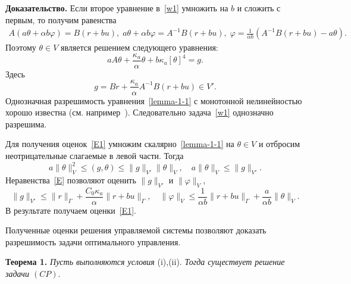 \documentclass[12pt]{article}
\begin{document}
    {\bf Доказательство.}
    Если второе уравнение в~\eqref{w1} умножить на $b$ и сложить с первым, то получим равенства
    \begin{gather*}
        A \left( a \theta + \alpha b \varphi \right) = B(r + bu),\;
        a\theta + \alpha b \varphi = A^{-1}B(r + bu),\;
        \varphi = \frac{1}{\alpha b}(A^{-1}B(r +bu) - a\theta).
    \end{gather*}
    Поэтому $\theta \in V$ является решением следующего уравнения:
    \begin{equation}
        \label{lemma-1-1}
        a A \theta + \frac{\kappa_a}{\alpha} \theta + b\kappa_a [\theta]^4 = g.
    \end{equation}
    Здесь \[ g = Br + \frac{\kappa_a}{\alpha}A^{-1}B(r+bu) \in V'. \]
    Однозначная разрешимость уравнения~\eqref{lemma-1-1} с монотонной нелинейностью
    хорошо известна (см.
    например~\cite{Kufner}).
    Следовательно задача~\eqref{w1} однозначно разрешима.

    Для получения оценок~\eqref{E1} умножим скалярно~\eqref{lemma-1-1} на $\theta \in V$ и отбросим неотрицательные
    слагаемые в левой части.
    Тогда
    \[
        a \|\theta\|^2_V \leq (g, \theta) \leq \|g\|_{V'}\|\theta\|_V,
        \quad a\|\theta\|_V \leq \|g\|_{V'}.
    \]
    Неравенства~\eqref{E} позволяют оценить $\|g\|_{V'}$ и $\|\varphi\|_V $,
    \[
        \|g\|_{V'} \leq \|r\|_\Gamma + \frac{C_0\kappa_a}{\alpha}\|r + bu\|_\Gamma, \quad
        \|\varphi\|_V \leq \frac{1}{\alpha b} \|r + bu\|_\Gamma + \frac{a}{\alpha b} \|\theta\|_V.
    \]
    В результате получаем оценки~\eqref{E1}.

Полученные оценки решения управляемой системы позволяют доказать
разрешимость задачи оптимального управления.

    \textbf{Теорема 1.}
    {\it
    Пусть выполняются условия} (i),(ii).
    {\it Тогда существует решение задачи $(CP).$
    }
\end{document}
